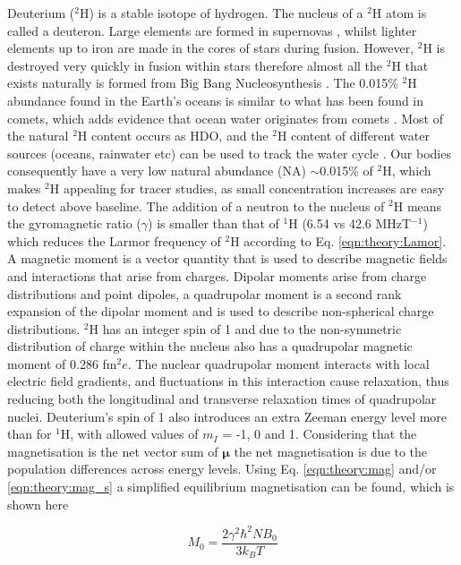 Deuterium ($^2$H) is a stable isotope of hydrogen. The nucleus of a $^2$H atom is called a deuteron. Large elements are formed in supernovas \cite{Watson2019IdentificationStars}, whilst lighter elements up to iron are made in the cores of stars during fusion. However, $^2$H is destroyed very quickly in fusion within stars \cite{Patrignani2016ReviewPhysics} therefore almost all the $^2$H that exists naturally is formed from Big Bang Nucleosynthesis \cite{Joseph2023GeologicalEarth}. The 0.015\% $^2$H abundance found in the Earth's oceans is similar to what has been found in comets, which adds evidence that ocean water originates from comets \cite{Hersant2001APlanets}. Most of the natural $^2$H content occurs as \ac{HDO}, and the $^2$H content of different water sources (oceans, rainwater etc) can be used to track the water cycle \cite{Bowen2019IsotopesApplications}. Our bodies consequently have a very low natural abundance (NA) $\sim$0.015\% of $^2$H, which makes $^2$H appealing for tracer studies, as small concentration increases are easy to detect above baseline. The addition of a neutron to the nucleus of $^2$H means the gyromagnetic ratio ($\gamma$) is smaller than that of $^1$H (6.54 vs 42.6 MHzT$^{-1}$) which reduces the Larmor frequency of $^2$H according to Eq. \ref{eqn:theory:Lamor}. A magnetic moment is a vector quantity that is used to describe magnetic fields and interactions that arise from charges. Dipolar moments arise from charge distributions and point dipoles, a quadrupolar moment is a second rank expansion of the dipolar moment and is used to describe non-spherical charge distributions. $^2$H has an integer spin of 1 and due to the non-symmetric distribution of charge within the nucleus also has a quadrupolar magnetic moment of 0.286 fm$^2e$. The nuclear quadrupolar moment interacts with local electric field gradients, and fluctuations in this interaction cause relaxation, thus reducing both the longitudinal and transverse relaxation times of quadrupolar nuclei. Deuterium's spin of 1 also introduces an extra Zeeman energy level more than for $^1$H, with allowed values of $m_I$ = -1, 0 and 1. Considering that the magnetisation is the net vector sum of $\mathbf{\mu}$ the net magnetisation is due to the population differences across energy levels. Using Eq. \ref{eqn:theory:mag} and/or \ref{eqn:theory:mag_s} a simplified equilibrium magnetisation can be found, which is shown here

\begin{equation}
    M_0 = \frac{2\gamma^2 \hbar^2 N B_0}{3k_BT}
    \label{eqn:theory:mag_2H}
\end{equation}

